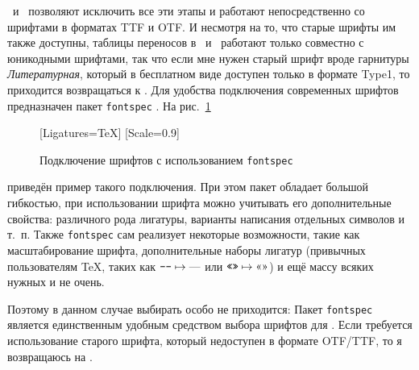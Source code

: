 \documentclass[a4paper,12pt,hyphens]{article}
\newcommand\softname[1]{\textit{#1}}
\newcommand\package[1]{\texttt{#1}}
\newcommand\lcmd[1]{\texttt{#1}}
\begin{document}
\XeTeX\ и \LuaTeX\ позволяют исключить все эти этапы и работают
непосредственно со шрифтами в форматах TTF и OTF. И несмотря на то, что старые
шрифты им также доступны, таблицы переносов в \XeTeX\ и \LuaTeX\ работают только
совместно с юникодными шрифтами, так что если мне нужен старый шрифт вроде гарнитуры
\softname{Литературная}, который в бесплатном виде доступен только в формате Type1, то приходится
возвращаться к \pdfLaTeX. Для удобства подключения современных шрифтов
предназначен пакет \package{fontspec} \parencite{ctan-fontspec}.
На рис.~\ref{fontspec1}
\begin{figure}[tp]
\begin{latexcode}
\usepackage{fontspec}
\setmainfont{STIX Two Text}[Ligatures=TeX]
\setmonofont{PT Mono}[Scale=0.9]
\end{latexcode}
\caption{Подключение шрифтов с использованием
\package{fontspec}}\label{fontspec1}
\end{figure}
приведён пример такого подключения. При этом пакет обладает большой
гибкостью, при использовании шрифта можно учитывать его дополнительные
свойства: различного рода лигатуры, варианты написания отдельных
символов и т.~п. Также \package{fontspec} сам реализует некоторые
возможности, такие как масштабирование шрифта, дополнительные наборы
лигатур (привычных пользователям \TeX, таких как
$\mbox{\lcmd{---}}\mapsto\text{---}$ или $\mbox{\lcmd{<<>>}}\mapsto\text{<<>>}$)
и ещё массу всяких нужных и не очень.

Поэтому в данном случае выбирать особо не приходится: Пакет \package{fontspec}
является единственным удобным средством выбора шрифтов для \LuaLaTeX. Если требуется использование
старого шрифта, который недоступен в формате OTF/TTF, то я возвращаюсь на \pdfLaTeX.
\end{document}
